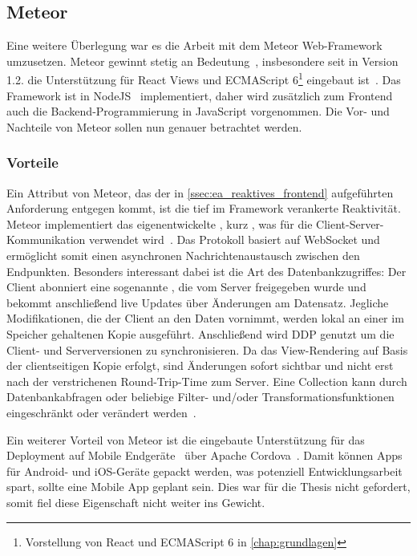 \subsection{Meteor}
\label{ssec:el_meteor}

Eine weitere Überlegung war es die Arbeit mit dem Meteor Web-Framework
umzusetzen.  Meteor gewinnt stetig an Bedeutung~\cite{hotframeworks},
insbesondere seit in Version 1.2. die Unterstützung für React Views und
ECMAScript 6\footnote{Vorstellung von React und ECMAScript 6 in
\cref{chap:grundlagen}} eingebaut ist~\cite{meteor12}.  Das Framework ist in
NodeJS~\cite{nodejs} implementiert, daher wird zusätzlich zum Frontend auch die
Backend-Programmierung in JavaScript vorgenommen.  Die Vor- und Nachteile von
Meteor sollen nun genauer betrachtet werden.

\subsubsection{Vorteile}
\label{sssec:elm_vorteile}

Ein Attribut von Meteor, das der in \cref{ssec:ea_reaktives_frontend}
aufgeführten Anforderung entgegen kommt, ist die tief im Framework verankerte
Reaktivität.  Meteor implementiert das eigenentwickelte
, kurz ,
was für die Client-Server-Kommunikation verwendet wird~\cite{ddp}.  Das
Protokoll basiert auf WebSocket und ermöglicht somit einen asynchronen
Nachrichtenaustausch zwischen den Endpunkten.  Besonders interessant dabei ist
die Art des Datenbankzugriffes:  Der Client abonniert eine sogenannte
, die vom Server freigegeben wurde und bekommt
anschließend live Updates über Änderungen am Datensatz.  Jegliche
Modifikationen, die der Client an den Daten vornimmt, werden lokal an einer im
Speicher gehaltenen Kopie ausgeführt.  Anschließend wird DDP genutzt um die
Client- und Serverversionen zu synchronisieren.  Da das View-Rendering auf
Basis der clientseitigen Kopie erfolgt, sind Änderungen sofort sichtbar und
nicht erst nach der verstrichenen Round-Trip-Time zum Server.  Eine Collection
kann durch Datenbankabfragen oder beliebige Filter- und/oder
Transformationsfunktionen eingeschränkt oder verändert werden~\cite{meteordoc}.

Ein weiterer Vorteil von Meteor ist die eingebaute Unterstützung für das
Deployment auf Mobile Endgeräte~\cite{meteormobile} über Apache
Cordova~\cite{cordova}.  Damit können Apps für Android- und iOS-Geräte gepackt
werden, was potenziell Entwicklungsarbeit spart, sollte eine Mobile App geplant
sein.  Dies war für die Thesis nicht gefordert, somit fiel diese Eigenschaft
nicht weiter ins Gewicht.

